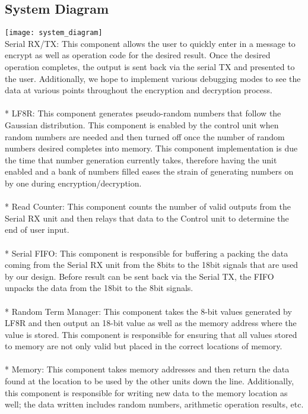 \documentclass{article}
\begin{document}
\subsection{System Diagram}
\texttt{[image: system\_diagram]}
\\
Serial RX/TX: This component allows the user to quickly enter in a message to encrypt as well as operation code for the desired result. Once the desired operation completes, the output is sent back via the serial TX and presented to the user. Additionally, we hope to implement various debugging modes to see the data at various points throughout the encryption and decryption process.
\\
\\*
LF8R: This component generates pseudo-random numbers that follow the Gaussian distribution. This component is enabled by the control unit when random numbers are needed and then turned off once the number of random numbers desired completes into memory. This component implementation is due the time that number generation currently takes, therefore having the unit enabled and a bank of numbers filled eases the strain of generating numbers on by one during encryption/decryption. 
\\
\\*
Read Counter: This component counts the number of valid outputs from the Serial RX unit and then relays that data to the Control unit to determine the end of user input.
\\
\\*
Serial FIFO: This component is responsible for buffering a packing the data coming from the Serial RX unit from the 8bits to the 18bit signals that are used by our design. Before result can be sent back via the Serial TX, the FIFO unpacks the data from the 18bit to the 8bit signals.
\\
\\*
Random Term Manager: This component takes the 8-bit values generated by LF8R and then output an 18-bit value as well as the memory address where the value is stored. This component is responsible for ensuring that all values stored to memory are not only valid but placed in the correct locations of memory.  
\\
\\*
Memory: This component takes memory addresses and then return the data found at the location to be used by the other units down the line. Additionally, this component is responsible for writing new data to the memory location as well; the data written includes random numbers, arithmetic operation results, etc.
\end{document}
